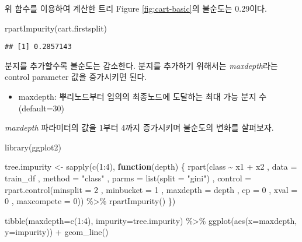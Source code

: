 \documentclass[
]{book}
\newenvironment{Shaded}{\begin{snugshade}}{\end{snugshade}}
\newcommand{\AttributeTok}[1]{\textcolor[rgb]{0.77,0.63,0.00}{#1}}
\newcommand{\ControlFlowTok}[1]{\textcolor[rgb]{0.13,0.29,0.53}{\textbf{#1}}}
\newcommand{\DecValTok}[1]{\textcolor[rgb]{0.00,0.00,0.81}{#1}}
\newcommand{\FunctionTok}[1]{\textcolor[rgb]{0.00,0.00,0.00}{#1}}
\newcommand{\NormalTok}[1]{#1}
\newcommand{\OtherTok}[1]{\textcolor[rgb]{0.56,0.35,0.01}{#1}}
\newcommand{\SpecialCharTok}[1]{\textcolor[rgb]{0.00,0.00,0.00}{#1}}
\newcommand{\StringTok}[1]{\textcolor[rgb]{0.31,0.60,0.02}{#1}}
\providecommand{\tightlist}{%
  \setlength{\itemsep}{0pt}\setlength{\parskip}{0pt}}
\begin{document}
위 함수를 이용하여 계산한 트리 Figure \ref{fig:cart-basic}의 불순도는 0.29이다.

\begin{Shaded}
\begin{Highlighting}[]
\FunctionTok{rpartImpurity}\NormalTok{(cart.firstsplit)}
\end{Highlighting}
\end{Shaded}

\begin{verbatim}
## [1] 0.2857143
\end{verbatim}

분지를 추가할수록 불순도는 감소한다. 분지를 추가하기 위해서는 \emph{maxdepth}라는 control parameter 값을 증가시키면 된다.

\begin{itemize}
\tightlist
\item
  maxdepth: 뿌리노드부터 임의의 최종노드에 도달하는 최대 가능 분지 수 (default=30)
\end{itemize}

\emph{maxdepth} 파라미터의 값을 1부터 4까지 증가시키며 불순도의 변화를 살펴보자.

\begin{Shaded}
\begin{Highlighting}[]
\FunctionTok{library}\NormalTok{(ggplot2)}

\NormalTok{tree.impurity }\OtherTok{\textless{}{-}} \FunctionTok{sapply}\NormalTok{(}\FunctionTok{c}\NormalTok{(}\DecValTok{1}\SpecialCharTok{:}\DecValTok{4}\NormalTok{), }\ControlFlowTok{function}\NormalTok{(depth) \{}
  \FunctionTok{rpart}\NormalTok{(class }\SpecialCharTok{\textasciitilde{}}\NormalTok{ x1 }\SpecialCharTok{+}\NormalTok{ x2}
\NormalTok{        , }\AttributeTok{data =}\NormalTok{ train\_df}
\NormalTok{        , }\AttributeTok{method =} \StringTok{"class"}
\NormalTok{        , }\AttributeTok{parms =} \FunctionTok{list}\NormalTok{(}\AttributeTok{split =} \StringTok{"gini"}\NormalTok{)}
\NormalTok{        , }\AttributeTok{control =} \FunctionTok{rpart.control}\NormalTok{(}\AttributeTok{minsplit =} \DecValTok{2}
\NormalTok{                                  , }\AttributeTok{minbucket =} \DecValTok{1}
\NormalTok{                                  , }\AttributeTok{maxdepth =}\NormalTok{ depth}
\NormalTok{                                  , }\AttributeTok{cp =} \DecValTok{0}
\NormalTok{                                  , }\AttributeTok{xval =} \DecValTok{0}
\NormalTok{                                  , }\AttributeTok{maxcompete =} \DecValTok{0}\NormalTok{)) }\SpecialCharTok{\%\textgreater{}\%}
  \FunctionTok{rpartImpurity}\NormalTok{()}
\NormalTok{\})}

\FunctionTok{tibble}\NormalTok{(}\AttributeTok{maxdepth=}\FunctionTok{c}\NormalTok{(}\DecValTok{1}\SpecialCharTok{:}\DecValTok{4}\NormalTok{), }\AttributeTok{impurity=}\NormalTok{tree.impurity) }\SpecialCharTok{\%\textgreater{}\%}
  \FunctionTok{ggplot}\NormalTok{(}\FunctionTok{aes}\NormalTok{(}\AttributeTok{x=}\NormalTok{maxdepth, }\AttributeTok{y=}\NormalTok{impurity)) }\SpecialCharTok{+}
  \FunctionTok{geom\_line}\NormalTok{()}
\end{Highlighting}
\end{Shaded}
\end{document}
